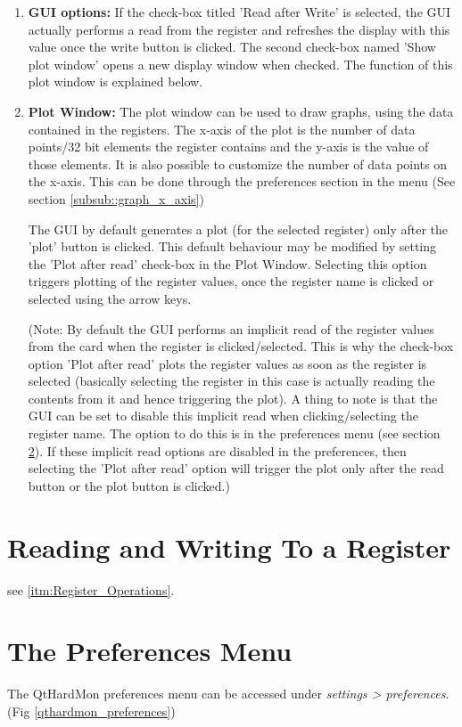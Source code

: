 \begin{enumerate}
\item \textbf{GUI options:} If the check-box titled 'Read after Write' is selected, the GUI actually performs a read from the register and refreshes the display with this value once the write button is clicked. The second check-box named 'Show plot window' opens a new display window when checked. The function of this  plot window is explained below.

\item \textbf{Plot Window:} The plot window can be used to draw graphs, using the data contained in the registers. The x-axis of the plot is the number of data points/32 bit elements the register contains and the y-axis is the value of those elements. It is also possible to customize the number of data points on the x-axis. This can be done through the preferences section in the menu (See section \ref{subsub::graph_x_axis})

The GUI by default generates a plot (for the selected register) only after the 'plot' button is clicked. This default behaviour may be modified by setting the 'Plot after read' check-box in the Plot Window. Selecting this option triggers plotting of the register values, once the register name is clicked or selected using the arrow keys. 
	
(Note: By default the GUI performs an implicit read of the register values from the card when the register is clicked/selected. This is why the check-box option 'Plot after read' plots the register values as soon as the register is selected (basically selecting the register in this case is actually reading the contents from it and hence triggering the plot). A thing to note is that the GUI can be set to disable this implicit read when clicking/selecting the register name. The option to do this is in the preferences menu (see section \ref{preference_section}). If these implicit read options are disabled in the preferences, then selecting the 'Plot after read' option will trigger the plot only after the read button or the plot button is clicked.)

\end{enumerate}

\section{Reading and Writing To a Register}
see \ref{itm:Register_Operations}.

\section{The Preferences Menu}\label{preference_section}
The QtHardMon preferences menu can be accessed under \textit{settings > preferences}. (Fig \ref{qthardmon_preferences})

